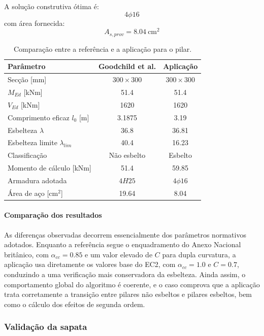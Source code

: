 A solução construtiva ótima é:
\begin{equation}
4\phi16
\end{equation}
com área fornecida:
\begin{equation}
A_{s,prov} = 8.04\ \text{cm}^2
\end{equation}

\begin{table}[H]
\centering
\caption{Comparação entre a referência e a aplicação para o pilar.}
\label{tab:comp_pilar}
\renewcommand{\arraystretch}{1.2}
\begin{tabular}{lcc}
\toprule
\textbf{Parâmetro} & \textbf{Goodchild et al.} & \textbf{Aplicação} \\
\midrule
Secção [mm] & \(300 \times 300\) & \(300 \times 300\) \\
\(M_{Ed}\) [kNm] & 51.4 & 51.4 \\
\(V_{Ed}\) [kNm] & 1620 & 1620 \\
Comprimento eficaz \(l_0\) [m] & 3.1875 & 3.19 \\
Esbelteza \(\lambda\) & 36.8 & 36.81 \\
Esbelteza limite \(\lambda_{lim}\) & 40.4 & 16.23 \\
Classificação & Não esbelto & Esbelto \\
Momento de cálculo [kNm] & 51.4 & 59.85 \\
Armadura adotada & \(4H25\) & \(4\phi16\) \\
Área de aço [cm\(^2\)] & 19.64 & 8.04 \\
\bottomrule
\end{tabular}
\end{table}

\paragraph{Comparação dos resultados}
As diferenças observadas decorrem essencialmente dos parâmetros normativos adotados. Enquanto a referência segue o enquadramento do Anexo Nacional britânico, com \(\alpha_{cc}=0.85\) e um valor elevado de \(C\) para dupla curvatura, a aplicação usa diretamente os valores base do EC2, com \(\alpha_{cc}=1.0\) e \(C=0.7\), conduzindo a uma verificação mais conservadora da esbelteza. Ainda assim, o comportamento global do algoritmo é coerente, e o caso comprova que a aplicação trata corretamente a transição entre pilares não esbeltos e pilares esbeltos, bem como o cálculo dos efeitos de segunda ordem.

\subsubsection{Validação da sapata}

